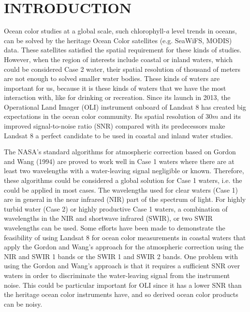 \documentclass[draft]{spie}  %
\begin{document}
\section{INTRODUCTION}
\label{sec:intro}  %
Ocean color studies at a global scale, such chlorophyll-{\it a} level trends in oceans, can be solved by the heritage Ocean Color satellites (e.g. SeaWiFS, MODIS) data. These satellites satisfied the spatial requirement for these kinds of studies. However, when the region of interests include coastal or inland waters, which could be considered Case 2 water, their spatial resolution of thousand of meters are not enough to solved smaller water bodies. These kinds of waters are important for us, because it is these kinds of waters that we have the most interaction with, like for drinking or recreation. Since its launch in 2013, the Operational Land Imager (OLI) instrument onboard of Landsat 8 has created big expectations in the ocean color community. Its spatial resolution of $30m$ and its improved signal-to-noise ratio (SNR) compared with its predecessors make Landsat 8 a perfect candidate to be used in coastal and inland water studies. 

The NASA's standard algorithms for atmospheric correction based on Gordon and Wang (1994)\cite{Gordon:1994} are proved to work well in Case 1 waters where there are at least two wavelengths with a water-leaving signal negligible or known. Therefore, these algorithms could be considered a global solution for Case 1 waters, i.e. the could be applied in most cases. The wavelengths used for clear waters (Case 1) are in general in the near infrared (NIR) part of the spectrum of light. For highly turbid water (Case 2) or highly productive Case 1 waters, a combination of wavelengths in the NIR and shortwave infrared (SWIR), or two SWIR wavelengths can be used\cite{Wang:2007,Wang:2007dz,Wang2009}. Some efforts have been made to demonstrate the feasibility of using Landsat 8 for ocean color measurements in coastal waters that apply the Gordon and Wang's approach\cite{Vanhellemont2014a,Vanhellemont2014,Vanhellemont:2015,Franz:2015} for the atmospheric correction using the NIR and SWIR 1 bands or the SWIR 1 and SWIR 2 bands. One problem with using the Gordon and Wang's approach is that it requires a sufficient SNR over waters in order to discriminate the water-leaving signal from the instrument noise. This could be particular important for OLI since it has a lower SNR than the heritage ocean color instruments have, and so derived ocean color products can be noisy.
\end{document}
